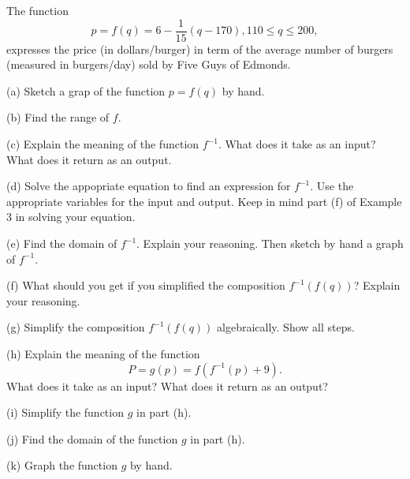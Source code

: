 \documentclass{ximera}
\begin{document}
\begin{example}  \label{Ex3:Inverse}
The function
\[
    p = f(q) = 6 - \frac{1}{15} \left(  q- 170 \right) , 110 \leq q \leq 200 ,
\]
expresses the price (in dollars/burger) in term of the average number of burgers (measured in burgers/day) sold by Five Guys of Edmonds.

(a) Sketch a grap of the function $p=f(q)$ by hand.

(b) Find the range of $f$.

(c) Explain the meaning of the function $f^{-1}$. What does it take as an input? What does it return as an output.

(d) Solve the appopriate equation to find an expression for $f^{-1}$. Use the appropriate variables for the input and output. Keep in mind part (f) of Example 3 in solving your equation.

(e) Find the domain of $f^{-1}$. Explain your reasoning. Then sketch by hand a graph of $f^{-1}$.

(f) What should you get if you simplified the composition $f^{-1}(f(q))$? Explain your reasoning.

(g) Simplify the composition $f^{-1}(f(q))$ algebraically. Show all steps.

(h) Explain the meaning of the function 
\[
  P = g(p) = f(f^{-1}(p)+9).
\]
What does it take as an input? What does it return as an output?

(i) Simplify the function $g$ in part (h).

(j) Find the domain of the function $g$ in part (h).

(k) Graph the function $g$ by hand. 


\end{example}
\end{document}
